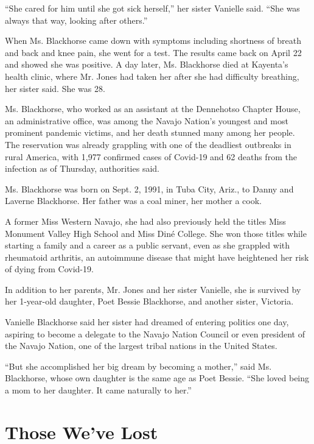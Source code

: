 ``She cared for him until she got sick herself,'' her sister Vanielle
said. ``She was always that way, looking after others.''

When Ms. Blackhorse came down with symptoms including shortness of
breath and back and knee pain, she went for a test. The results came
back on April 22 and showed she was positive. A day later, Ms.
Blackhorse died at Kayenta's health clinic, where Mr. Jones had taken
her after she had difficulty breathing, her sister said. She was 28.

Ms. Blackhorse, who worked as an assistant at the Dennehotso Chapter
House, an administrative office, was among the Navajo Nation's youngest
and most prominent pandemic victims, and her death stunned many among
her people. The reservation was already grappling with one of the
deadliest outbreaks in rural America, with 1,977 confirmed cases of
Covid-19 and 62 deaths from the infection as of Thursday, authorities
said.

Ms. Blackhorse was born on Sept. 2, 1991, in Tuba City, Ariz., to Danny
and Laverne Blackhorse. Her father was a coal miner, her mother a cook.

A former Miss Western Navajo, she had also previously held the titles
Miss Monument Valley High School and Miss Diné College. She won those
titles while starting a family and a career as a public servant, even as
she grappled with rheumatoid arthritis, an autoimmune disease that might
have heightened her risk of dying from Covid-19.

In addition to her parents, Mr. Jones and her sister Vanielle, she is
survived by her 1-year-old daughter, Poet Bessie Blackhorse, and another
sister, Victoria.

Vanielle Blackhorse said her sister had dreamed of entering politics one
day, aspiring to become a delegate to the Navajo Nation Council or even
president of the Navajo Nation, one of the largest tribal nations in the
United States.

``But she accomplished her big dream by becoming a mother,'' said Ms.
Blackhorse, whose own daughter is the same age as Poet Bessie. ``She
loved being a mom to her daughter. It came naturally to her.''

\href{https://www.nytimes3xbfgragh.onion/interactive/2020/obituaries/people-died-coronavirus-obituaries.html?action=click\&pgtype=Article\&state=default\&region=BELOW_MAIN_CONTENT\&context=covid_obits_promo}{}

\hypertarget{those-weve-lost}{%
\section{Those We've Lost}\label{those-weve-lost}}

